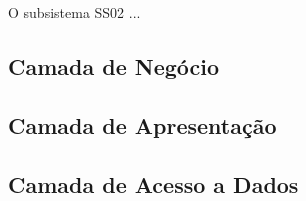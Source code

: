 O subsistema SS02 ...



\subsection{Camada de Negócio}
\label{sec-componentes-ss02-negocio}



\subsection{Camada de Apresentação}
\label{sec-componentes-ss02-apresentacao}



\subsection{Camada de Acesso a Dados}
\label{sec-componentes-ss02-dados}

